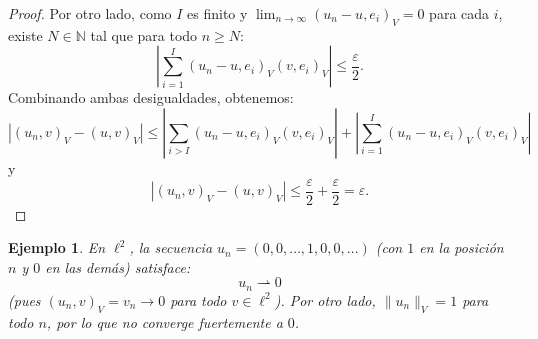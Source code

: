 \documentclass[12pt]{book}
\newtheorem{ex}{Ejemplo}
\theoremstyle{definition}
\theoremstyle{plain}
\theoremstyle{remark}
\begin{document}
\begin{proof}
Por otro lado, como \(I\) es finito y \(\lim_{n \to \infty} (u_n - u, e_i)_V = 0\) para cada \(i\), existe \(N \in \mathbb{N}\) tal que para todo \(n \geq N\):
\[
\left| \sum_{i = 1}^I (u_n - u, e_i)_V (v, e_i)_V \right| \leq \frac{\varepsilon}{2}.
\]
%
Combinando ambas desigualdades, obtenemos:
\[
|(u_n, v)_V - (u, v)_V| \leq \left| \sum_{i > I} (u_n - u, e_i)_V (v, e_i)_V \right| + \left| \sum_{i = 1}^I (u_n - u, e_i)_V (v, e_i)_V \right| %
\]
y
\[
|(u_n, v)_V - (u, v)_V| %
\leq \frac{\varepsilon}{2}
+
\frac{\varepsilon}{2}
= \varepsilon.
\]
%
%
%
\end{proof}

\begin{ex}
    En \(\ell^2\), la secuencia \(u_n = (0, 0, \dots, 1, 0, 0, \dots)\) (con \(1\) en la posición \(n\) y \(0\) en las demás) satisface:
    \[u_n \rightharpoonup 0\] (pues \( (u_n, v )_V = v_n \to 0\) para todo \(v \in \ell^2\)).
    Por otro lado, \(\|u_n\|_V = 1\) para todo \(n\), por lo que no converge fuertemente a \(0\).
\end{ex}
\end{document}
